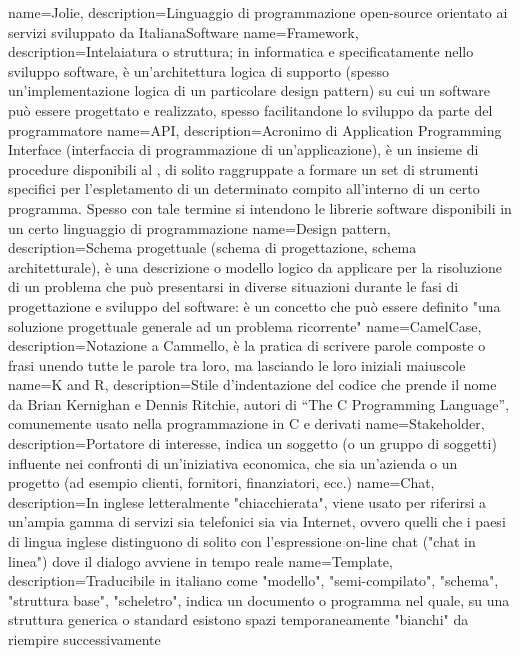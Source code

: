  {
	name=Jolie,
	description={Linguaggio di programmazione open-source orientato ai servizi sviluppato da
	ItalianaSoftware}
}
 {
	name=Framework,
	description={Intelaiatura o struttura; in informatica e specificatamente nello sviluppo software, è un'architettura logica di supporto (spesso un'implementazione logica di un particolare design
	pattern) su cui un software può essere progettato e realizzato, spesso facilitandone lo sviluppo
	da parte del programmatore}
}
 {
	name=API,
	description={Acronimo di Application Programming Interface (interfaccia di programmazione di
	un'applicazione), è un insieme di procedure disponibili al \programmatore, di solito
	raggruppate a formare un set di strumenti specifici per l'espletamento di un determinato
	compito all'interno di un certo programma. Spesso con tale termine si intendono le librerie
	software disponibili in un certo linguaggio di programmazione}
}
 {
	name=Design pattern,
	description={Schema progettuale (schema di progettazione, schema architetturale), è una
	descrizione o modello logico da applicare per la risoluzione di un problema che può presentarsi
	in diverse situazioni durante le fasi di progettazione e sviluppo del software: è un concetto
	che può essere definito "una soluzione progettuale generale ad un problema ricorrente"}
}
 {
	name=CamelCase,
	description={Notazione a Cammello, è la pratica di scrivere parole composte o frasi unendo tutte
	le parole tra loro, ma lasciando le loro iniziali maiuscole}
}
 {
	name=K and R,
	description={Stile d'indentazione del codice che prende il nome da Brian Kernighan e Dennis Ritchie, autori di ``The C Programming Language'', comunemente usato nella programmazione in C e derivati}
}
 {
	name=Stakeholder,
	description={Portatore di interesse, indica un soggetto (o un gruppo di soggetti) influente nei
	confronti di un'iniziativa economica, che sia un'azienda o un progetto (ad esempio clienti, fornitori, finanziatori, ecc.)}
}
 {
	name=Chat,
	description={In inglese letteralmente "chiacchierata", viene usato per riferirsi a un'ampia gamma
	di servizi sia telefonici sia via Internet, ovvero quelli che i paesi di lingua inglese
	distinguono di solito con l'espressione on-line chat ("chat in linea") dove il dialogo avviene
	in tempo reale}
}
 {
	name=Template,
	description={Traducibile in italiano come "modello", "semi-compilato", "schema", "struttura
	base", "scheletro", indica un documento o programma nel quale, su una struttura
	generica o standard esistono spazi temporaneamente "bianchi" da riempire successivamente}
}
